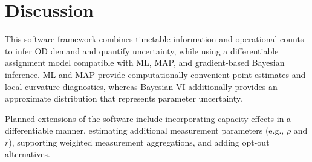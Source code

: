 \section{Discussion}

This software framework combines timetable information and operational counts to infer OD demand and quantify uncertainty,
while using a differentiable assignment model compatible with ML, MAP, and
gradient-based Bayesian inference. ML and MAP provide computationally convenient
point estimates and local curvature diagnostics, whereas Bayesian VI additionally
provides an approximate distribution that represents parameter uncertainty.

Planned extensions of the software include incorporating capacity effects in a
differentiable manner, estimating additional measurement parameters
(e.g., $\rho$ and $r$), supporting weighted measurement aggregations,
and adding opt-out alternatives.
